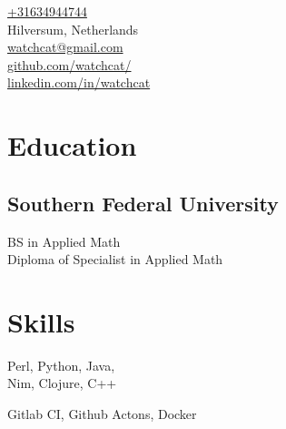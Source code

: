 \documentclass[]{hieudo-build}
\begin{document}
%
%
{
    \faPhone \href{tel:+31634944744}{+31634944744} \\
    \faHome Hilversum, Netherlands \\
	\faEnvelope \href{mailto:watchcat@gmail.com}{ watchcat@gmail.com}\\
	\faGithub \href{https://github.com/watchcat/}{ github.com/watchcat/}\\
	\faLinkedinSquare \href{https://www.linkedin.com/in/watchcat/}{   linkedin.com/in/watchcat}
}
    
%
%
\begin{minipage}[t]{0.34\textwidth} 

\section{Education} 

\subsection{Southern Federal University}
BS in Applied Math \\
Diploma of Specialist in Applied Math \\
\sectionsep

\section{Skills}
Perl, Python, Java, \\
Nim, Clojure, C++

\vspace{0.9em} %

Gitlab CI, Github Actons, Docker \\

\vspace{0.9em} %


\end{minipage}
\end{document}
